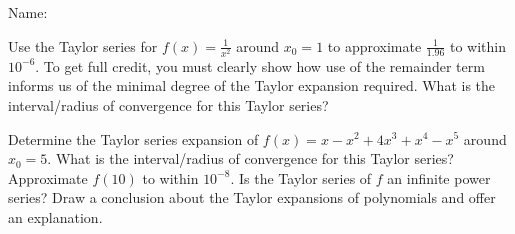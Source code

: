 \documentclass[10pt]{exam}
\begin{document}
$\phantom{x}$

\newcommand{\dd}{\textrm{d}}
\newcommand{\RR}{\mathbb R}

\newcommand{\bfa}{\mathbf a}
\newcommand{\bfb}{\mathbf b}
\newcommand{\bfc}{\mathbf c}
\newcommand{\bfd}{\mathbf d}
\newcommand{\bfe}{\mathbf e}
\newcommand{\bff}{\mathbf f}
\newcommand{\bfg}{\mathbf g}
\newcommand{\bfh}{\mathbf h}
\newcommand{\bfi}{\mathbf i}
\newcommand{\bfj}{\mathbf j}
\newcommand{\bfk}{\mathbf k}
\newcommand{\bfl}{\mathbf l}
\newcommand{\bfm}{\mathbf m}
\newcommand{\bfn}{\mathbf n}
\newcommand{\bfo}{\mathbf o}
\newcommand{\bfp}{\mathbf p}
\newcommand{\bfq}{\mathbf q}
\newcommand{\bfr}{\mathbf r}
\newcommand{\bfs}{\mathbf s}
\newcommand{\bft}{\mathbf t}
\newcommand{\bfu}{\mathbf u}
\newcommand{\bfv}{\mathbf v}
\newcommand{\bfw}{\mathbf w}
\newcommand{\bfx}{\mathbf x}
\newcommand{\bfy}{\mathbf y}
\newcommand{\bfz}{\mathbf z}

\noindent Name: \underline{\hspace{3.5in}}
\vskip 0.5cm

\begin{questions}
\question Use the Taylor series for $f(x)=\frac{1}{x^2}$ around $x_0=1$ to approximate $\frac{1}{1.96}$ to within $10^{-6}$.  To get full credit, you must clearly show how use of the remainder term informs us of the minimal degree of the Taylor expansion required.  What is the interval/radius of convergence for this Taylor series?

\question Determine the Taylor series expansion of $f(x) = x-x^2+4x^3+x^4-x^5$ around $x_0=5$.  What is the interval/radius of convergence for this Taylor series?  Approximate $f(10)$ to within $10^{-8}$.  Is the Taylor series of $f$ an infinite power series?  Draw a conclusion about the Taylor expansions of polynomials and offer an explanation.
\end{questions}
\end{document}
